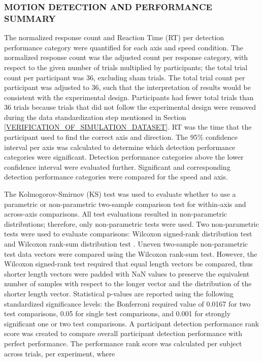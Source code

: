 \documentclass{ieeeaccess}
\begin{document}
\subsubsection{MOTION DETECTION AND PERFORMANCE SUMMARY}
\label{MOTION_DETECTION_AND_PERFORMANCE_SUMMARY}
The normalized response count and Reaction Time (RT) per detection performance category were quantified for each axis and speed condition. The normalized response count was the adjusted count per response category, with respect to the given number of trials multiplied by participants; the total trial count per participant was 36, excluding sham trials. The total trial count per participant was adjusted to 36, such that the interpretation of results would be consistent with the experimental design. Participants had fewer total trials than 36 trials because trials that did not follow the experimental design were removed during the data standardization step mentioned in Section \ref{VERIFICATION_OF_SIMULATION_DATASET}. RT was the time that the participant used to find the correct axis and direction. The 95\% confidence interval per axis was calculated to determine which detection performance categories were significant. Detection performance categories above the lower confidence interval were evaluated further. Significant and corresponding detection performance categories were compared for the speed and axis.

\indent The Kolmogorov-Smirnov (KS) test was used to evaluate whether to use a parametric or non-parametric two-sample comparison test for within-axis and across-axis comparisons. All test evaluations resulted in non-parametric distributions; therefore, only non-parametric tests were used. Two non-parametric tests were used to evaluate comparisons: Wilcoxon signed-rank distribution test and Wilcoxon rank-sum distribution test \cite{Foundation_2013_python}. Uneven two-sample non-parametric test data vectors were compared using the Wilcoxon rank-sum test. However, the Wilcoxon signed-rank test required that equal length vectors be compared, thus shorter length vectors were padded with NaN values to preserve the equivalent number of samples with respect to the longer vector and the distribution of the shorter length vector. Statistical p-values are reported using the following standardized significance levels: the Bonferroni required value of 0.0167 for two test comparisons, 0.05 for single test comparisons, and 0.001 for strongly significant one or two test comparisons. A participant detection performance rank score was created to compare overall participant detection performance with perfect performance. The performance rank score was calculated per subject across trials, per experiment, where
\end{document}
